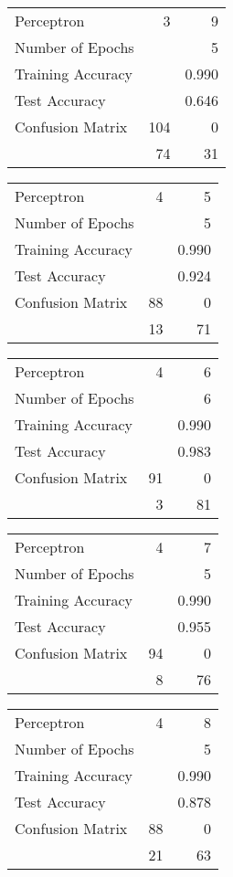\documentclass[11pt]{article}
\begin{document}
\begin{minipage}[t]{0.5\textwidth}
\begin{tabular}{|l | r r|}
\hline Perceptron & 3 & 9\\
Number of Epochs & & 5\\
Training Accuracy & & 0.990\\
Test Accuracy & & 0.646\\
Confusion Matrix & 104 & 0\\
 &74 & 31\\ \hline
\end{tabular}
\end{minipage}
\begin{minipage}[t]{0.5\textwidth}
\begin{tabular}{|l | r r|}
\hline Perceptron & 4 & 5\\
Number of Epochs & & 5\\
Training Accuracy & & 0.990\\
Test Accuracy & & 0.924\\
Confusion Matrix & 88 & 0\\
 &13 & 71\\ \hline
\end{tabular}
\end{minipage}
\begin{minipage}[t]{0.5\textwidth}
\begin{tabular}{|l | r r|}
\hline Perceptron & 4 & 6\\
Number of Epochs & & 6\\
Training Accuracy & & 0.990\\
Test Accuracy & & 0.983\\
Confusion Matrix & 91 & 0\\
 &3 & 81\\ \hline
\end{tabular}
\end{minipage}
\begin{minipage}[t]{0.5\textwidth}
\begin{tabular}{|l | r r|}
\hline Perceptron & 4 & 7\\
Number of Epochs & & 5\\
Training Accuracy & & 0.990\\
Test Accuracy & & 0.955\\
Confusion Matrix & 94 & 0\\
 &8 & 76\\ \hline
\end{tabular}
\end{minipage}
\begin{minipage}[t]{0.5\textwidth}
\begin{tabular}{|l | r r|}
\hline Perceptron & 4 & 8\\
Number of Epochs & & 5\\
Training Accuracy & & 0.990\\
Test Accuracy & & 0.878\\
Confusion Matrix & 88 & 0\\
 &21 & 63\\ \hline
\end{tabular}
\end{minipage}
\end{document}
